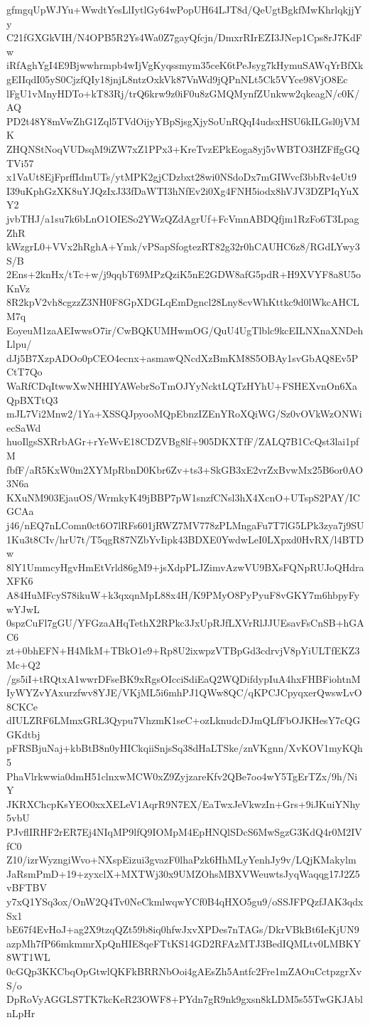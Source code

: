 gfmgqUpWJYu+WwdtYesLlIytlGy64wPopUH64LJT8d/QeUgtBgkfMwKhrlqkjjYy
C21fGXGkVIH/N4OPB5R2Ys4Wa0Z7gayQfcjn/DmxrRIrEZI3JNep1Cps8rJ7KdFw
iRfAghYgI4E9Bjwwhrmpb4wIjVgKyqssmym35ceK6tPeJsyg7kHymuSAWqYrBfXk
gEIIqdI05yS0CjzfQIy18jnjL8ntzOxkVk87VnWd9jQPnNLt5Ck5VYce98VjO8Ec
lFgU1vMnyHDTo+kT83Rj/trQ6krw9z0iF0u8zGMQMynfZUnkww2qkeagN/c0K/AQ
PD2t48Y8mVwZhG1Zql5TVdOijyYBpSjsgXjySoUnRQqI4udsxHSU6kILGsl0jVMK
ZHQNStNoqVUDsqM9iZW7xZ1PPx3+KreTvzEPkEoga8yj5vWBTO3HZFffgGQTVi57
x1VaUt8EjFprffIdmUTs/ytMPK2gjCDzbxt28wi0NSdoDx7mGIWvcf3bbRv4eUt9
I39uKphGzXK8uYJQzIxJ33fDaWTI3hNfEv2i0Xg4FNH5iodx8hVJV3DZPIqYuXY2
jvbTHJ/a1su7k6bLnO1OIESo2YWzQZdAgrUf+FcVmnABDQfjm1RzFo6T3LpagZhR
kWzgrL0+VVx2hRghA+Ymk/vPSapSfogtezRT82g32r0hCAUHC6z8/RGdLYwy3S/B
2Ens+2knHx/tTc+w/j9qqbT69MPzQziK5nE2GDW8afG5pdR+H9XVYF8a8U5oKnVz
8R2kpV2vh8cgzzZ3NH0F8GpXDGLqEmDgncl28Lny8cvWhKttkc9d0lWkcAHCLM7q
EoyeuM1zaAEIwwsO7ir/CwBQKUMHwmOG/QuU4UgTlblc9kcEILNXnaXNDehLlpu/
dJj5B7XzpADOo0pCEO4ecnx+asmawQNcdXzBmKM8S5OBAy1svGbAQ8Ev5PCtT7Qo
WaRfCDqItwwXwNHHIYAWebrSoTmOJYyNcktLQTzHYhU+FSHEXvnOn6XaQpBXTtQ3
mJL7Vi2Mnw2/1Ya+XSSQJpyooMQpEbnzIZEnYRoXQiWG/Sz0vOVkWzONWiecSaWd
huoIlgsSXRrbAGr+rYeWvE18CDZVBg8lf+905DKXTfF/ZALQ7B1CcQst3lai1pfM
fbfF/aR5KxW0m2XYMpRbnD0Kbr6Zv+ts3+SkGB3xE2vrZxBvwMx25B6or0AO3N6a
KXuNM903EjauOS/WrmkyK49jBBP7pW1snzfCNsl3hX4XcnO+UTspS2PAY/ICGCAa
j46/nEQ7nLComn0ct6O7lRFs601jRWZ7MV778zPLMngaFu7T7lG5LPk3zya7j9SU
1Ku3t8CIv/hrU7t/T5qgR87NZbYvIipk43BDXE0YwdwLeI0LXpxd0HvRX/l4BTDw
8lY1UmmcyHgvHmEtVrld86gM9+jsXdpPLJZimvAzwVU9BXsFQNpRUJoQHdraXFK6
A84HuMFcyS78ikuW+k3qxqnMpL88x4H/K9PMyO8PyPyuF8vGKY7m6hbpyFywYJwL
0spzCuFl7gGU/YFGzaAHqTethX2RPkc3JxUpRJfLXVrRlJJUEsavFsCnSB+hGAC6
zt+0bhEFN+H4MkM+TBkO1e9+Rp8U2ixwpzVTBpGd3cdrvjV8pYiULTfEKZ3Mc+Q2
/gs5iI+tRQtxA1wwrDFseBK9xRgsOIcciSdiEaQ2WQDifdypIuA4hxFHBFiohtnM
IyWYZvYAxurzfwv8YJE/VKjML5i6mhPJ1QWw8QC/qKPCJCpyqxerQwswLvO8CKCe
dIULZRF6LMmxGRL3Qypu7VhzmK1seC+ozLknudcDJmQLfFbOJKHesY7cQGGKdtbj
pFRSBjuNaj+kbBtB8n0yHICkqiiSnjsSq38dHaLTSke/znVKgnn/XvKOV1myKQh5
PhaVlrkwwia0dmH51clnxwMCW0xZ9ZyjzareKfv2QBe7oo4wY5TgErTZx/9h/NiY
JKRXChcpKsYEO0xxXELeV1AqrR9N7EX/EaTwxJeVkwzIn+Grs+9iJKuiYNhy5vbU
PJvflIRHF2rER7Ej4NIqMP9lfQ9IOMpM4EpHNQlSDcS6MwSgzG3KdQ4r0M2IVfC0
Z10/izrWyzngiWvo+NXspEizui3gvazF0lhaPzk6HhMLyYenhJy9v/LQjKMakylm
JaRsmPmD+19+zyxclX+MXTWj30x9UMZOhsMBXVWeuwtsJyqWaqqg17J2Z5vBFTBV
y7xQ1YSq3ox/OnW2Q4Tv0NeCkmlwqwYCf0B4qHXO5gu9/oSSJFPQzfJAK3qdxSx1
bE67f4EvHoJ+ag2X9tzqQZt59b8iq0hfwJxvXPDes7nTAGs/DkrVBkBt6IeKjUN9
azpMh7fP66mkmmrXpQnHIE8qeFTtKS14GD2RFAzMTJ3BedIQMLtv0LMBKY8WT1WL
0cGQp3KKCbqOpGtwlQKFkBRRNbOoi4gAEsZh5Antfc2Fre1mZAOuCctpzgrXvS/o
DpRoVyAGGLS7TK7kcKeR23OWF8+PYdn7gR9nk9gxsn8kLDM5s55TwGKJAblnLpHr
